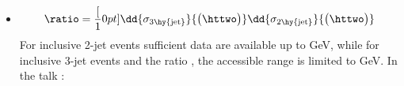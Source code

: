 \begin{frame}
\begin{itemize}
\begin{itemize}
\end{itemize}
\item {\scriptsize %
\begin{equation}
 \label{eq:ratio_32}
 \ratio = \frac[10pt]{{\dd{\sigma_{3\hy {\rm jet}}}{\big(\httwo\big)}}}{\dd{\sigma_{2\hy {\rm jet}}}{\big(\httwo\big)}}
\end{equation}
For inclusive 2-jet events sufficient data are available up to \httwo {} GeV, while for inclusive 3-jet events and the ratio \rations, the accessible range is limited to \httwo {} GeV. In the talk : \\}
\tri
{}
\end{itemize}
\end{frame}
\ball

